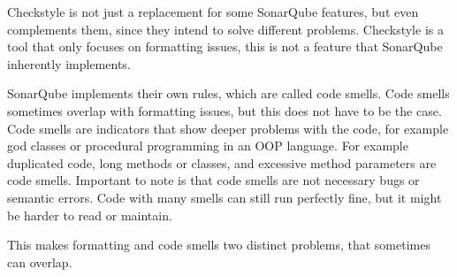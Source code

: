 Checkstyle is not just a replacement for some SonarQube features, but even complements them, since they intend to solve different problems.
Checkstyle is a tool that only focuses on formatting issues, this is not a feature that SonarQube inherently implements.

SonarQube implements their own rules, which are called code smells.
Code smells sometimes overlap with formatting issues, but this does not have to be the case.
Code smells are indicators that show deeper problems with the code, for example god classes or procedural programming in an OOP language.
For example duplicated code, long methods or classes, and excessive method parameters are code smells.
Important to note is that code smells are not necessary bugs or semantic errors.
Code with many smells can still run perfectly fine, but it might be harder to read or maintain.

This makes formatting and code smells two distinct problems, that sometimes can overlap.
